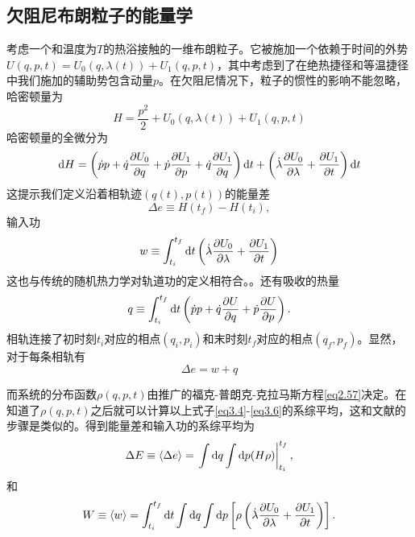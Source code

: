 \subsection{欠阻尼布朗粒子的能量学}
\qquad 考虑一个和温度为$T$的热浴接触的一维布朗粒子。它被施加一个依赖于时间的外势$U(q,p,t) = U_0 (q,\lambda(t)) + U_1 (q,p,t)$，其中考虑到了在绝热捷径和等温捷径中我们施加的辅助势包含动量$p$。在欠阻尼情况下，粒子的惯性的影响不能忽略，哈密顿量为
\begin{equation}
    H=\frac{p^{2}}{2}+U_0 (q,\lambda(t)) + U_1 (q,p,t)
    \label{eq3.1}
\end{equation}
哈密顿量的全微分为
\begin{equation}
    \mathrm{d} H=\left(\dot{p} p+\dot{q} \frac{\partial U_0}{\partial q} +  \dot{p} \frac{\partial U_1}{\partial p} + \dot{q} \frac{\partial U_1}{\partial q}  \right) \mathrm{d} t+\left(\dot{\lambda} \frac{\partial U_0}{\partial \lambda} + \frac{\partial U_1}{\partial t} \right) \mathrm{d} t
    \label{eq3.2}
\end{equation}
这提示我们定义沿着相轨迹$(q(t), p(t))$的能量差\cite{Tu2013}
\begin{equation}
     \Delta e \equiv H\left(t_{f}\right)-H\left(t_{i}\right),
     \label{eq3.3}
\end{equation}
输入功
\begin{equation}
    w \equiv \int_{t_{i}}^{t_{f}} \mathrm{d} t \left( \dot{\lambda} \frac{\partial U_0}{\partial \lambda} + \frac{\partial U_1}{\partial t} \right)
    \label{eq3.4}
\end{equation}
这也与传统的随机热力学对轨道功的定义相符合。\cite{Sekimoto2010,Jarzynski1997,Sekimoto_1997}。还有吸收的热量
\begin{equation}
    q \equiv \int_{t_{i}}^{t_{f}} \mathrm{d} t \left(\dot{p} p+\dot{q} \frac{\partial U}{\partial q} +  \dot{p} \frac{\partial U}{\partial p}\right).
    \label{eq3.5}
\end{equation}
相轨连接了初时刻$t_i$对应的相点$(q_i , p_i )$和末时刻$t_f$对应的相点$(q_f , p_f )$。显然，对于每条相轨有
\begin{equation}
    \Delta e = w + q
    \label{eq3.6}
\end{equation}

而系统的分布函数$\rho (q,p,t)$由推广的福克-普朗克-克拉马斯方程\eqref{eq2.57}决定。在知道了$\rho (q,p,t)$之后就可以计算以上式子\eqref{eq3.4}-\eqref{eq3.6}的系综平均，这和文献\cite{Seifert2005,Shizume1995,Bizarro2011}的步骤是类似的。得到能量差和输入功的系综平均为
\begin{equation}
    \Delta E \equiv \langle\Delta e\rangle=\left.\int \mathrm{d} q \int \mathrm{d} p(H \rho)\right|_{t_{i}} ^{t_{f}} ,
    \label{eq3.7}
\end{equation}
和
\begin{equation}
    W \equiv\langle w\rangle=\int_{t_{i}}^{t_{f}} \mathrm{d} t \int \mathrm{d} q \int \mathrm{d} p \left[ \rho\left( \dot{\lambda} \frac{\partial U_0}{\partial \lambda} + \frac{\partial U_1}{\partial t} \right)\right] .
    \label{eq3.8}
\end{equation}

